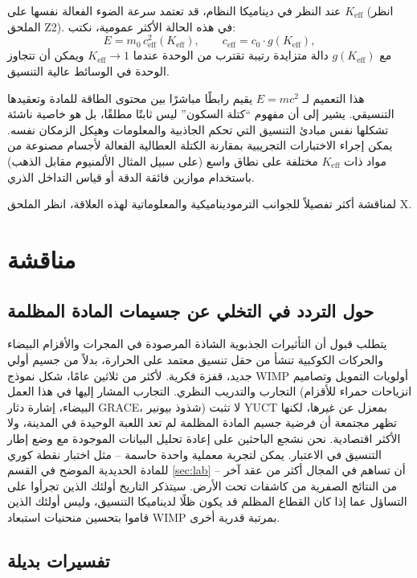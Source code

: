 \documentclass[11pt,a4paper]{article}
\begin{document}
	عند النظر في ديناميكا النظام، قد تعتمد سرعة الضوء الفعالة نفسها على $K_{\mathrm{eff}}$ (انظر الملحق Z2). في هذه الحالة الأكثر عمومية، نكتب:
	\[
	E = m_{0} \, c_{\mathrm{eff}}^{2}(K_{\mathrm{eff}}),\qquad
	c_{\mathrm{eff}} = c_{0} \cdot g(K_{\mathrm{eff}}),
	\]
	مع $g(K_{\mathrm{eff}})$ دالة متزايدة رتيبة تقترب من الوحدة عندما $K_{\mathrm{eff}} \to 1$ ويمكن أن تتجاوز الوحدة في الوسائط عالية التنسيق.
	
	هذا التعميم لـ $E = mc^{2}$ يقيم رابطًا مباشرًا بين محتوى الطاقة للمادة وتعقيدها التنسيقي. يشير إلى أن مفهوم ``كتلة السكون'' ليس ثابتًا مطلقًا، بل هو خاصية ناشئة تشكلها نفس مبادئ التنسيق التي تحكم الجاذبية والمعلومات وهيكل الزمكان نفسه. يمكن إجراء الاختبارات التجريبية بمقارنة الكتلة العطالية الفعالة لأجسام مصنوعة من مواد ذات $K_{\mathrm{eff}}$ مختلفة على نطاق واسع (على سبيل المثال الألمنيوم مقابل الذهب) باستخدام موازين فائقة الدقة أو قياس التداخل الذري.
	
	لمناقشة أكثر تفصيلاً للجوانب الترموديناميكية والمعلوماتية لهذه العلاقة، انظر الملحق X.
	
	\section{مناقشة}
	\label{sec:discussion}
	
	\subsection{حول التردد في التخلي عن جسيمات المادة المظلمة}
	\label{subsec:on-reluctance}
	
	يتطلب قبول أن التأثيرات الجذبوية الشاذة المرصودة في المجرات والأقزام البيضاء والحركات الكوكبية تنشأ من حقل تنسيق معتمد على الحرارة، بدلاً من جسيم أولي جديد، قفزة فكرية. لأكثر من ثلاثين عامًا، شكل نموذج WIMP أولويات التمويل وتصاميم التجارب والتدريب النظري. التجارب المشار إليها في هذا العمل (انزياحات حمراء للأقزام البيضاء، إشارة دثار GRACE، شذوذ بيونير) لا تثبت YUCT بمعزل عن غيرها، لكنها تظهر مجتمعة أن فرضية جسيم المادة المظلمة لم تعد اللعبة الوحيدة في المدينة، ولا الأكثر اقتصادية. نحن نشجع الباحثين على إعادة تحليل البيانات الموجودة مع وضع إطار التنسيق في الاعتبار. يمكن لتجربة معملية واحدة حاسمة – مثل اختبار نقطة كوري للمادة الحديدية الموضح في القسم \ref{sec:lab} – أن تساهم في المجال أكثر من عقد آخر من النتائج الصفرية من كاشفات تحت الأرض. سيتذكر التاريخ أولئك الذين تجرأوا على التساؤل عما إذا كان القطاع المظلم قد يكون ظلًا لديناميكا التنسيق، وليس أولئك الذين قاموا بتحسين منحنيات استبعاد WIMP بمرتبة قدرية أخرى.
	
	\subsection{تفسيرات بديلة}
	\label{subsec:discussion-alternatives}
	
\end{document}
